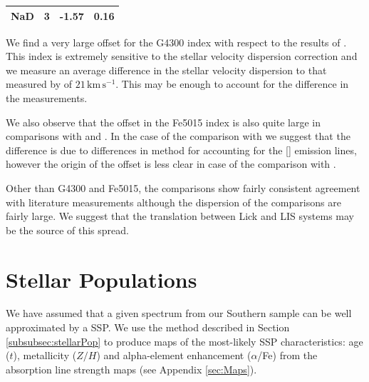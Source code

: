 \documentclass[a4paper,fleqn,usenatbib]{mnras}
\begin{document}
\begin{table}
\begin{tabular}{l r r r}
				NaD 		& 3 		& -1.57\leavevmode\phantom{0}& 0.16\leavevmode\phantom{0}	\\
				\hline
				\hline
			\end{tabular}
		\end{table}

		We find a very large offset for the G4300 index with respect to the results of \citet{Rampazzo2005}. This index is extremely sensitive to the stellar velocity dispersion correction and we measure an average difference in the stellar velocity dispersion to that measured by \citet{Rampazzo2005} of $21\,\mathrm{km\,s^{-1}}$. This may be enough to account for the difference in the measurements.

		We also observe that the offset in the Fe5015 index is also quite large in comparisons with \citet{Rampazzo2005} and \citet{Vazdekis2010}. In the case of the comparison with \citet{Rampazzo2005} we suggest that the difference is due to differences in method for accounting for the [] emission lines, however the origin of the offset is less clear in case of the comparison with \citet{Vazdekis2010}. 

		Other than G4300 and Fe5015, the comparisons show fairly consistent agreement with literature measurements although the dispersion of the comparisons are fairly large. We suggest that the translation between Lick and LIS systems may be the source of this spread.

\section{Stellar Populations}
	\label{sec:stellarPop}
	We have assumed that a given spectrum from our Southern sample can be well approximated by a SSP. We use the method described in Section \ref{subsubsec:stellarPop} to produce maps of the most-likely SSP characteristics: age ($t$), metallicity ($Z/H$) and alpha-element enhancement ($\alpha$/Fe) from the absorption line strength maps (see Appendix \ref{sec:Maps}).
\end{document}
